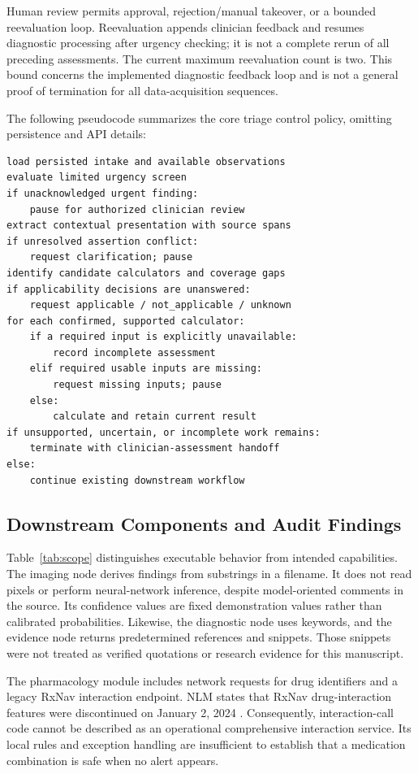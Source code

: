 \documentclass[conference]{IEEEtran}
\begin{document}
Human review permits approval, rejection/manual takeover, or a bounded reevaluation loop. Reevaluation appends clinician feedback and resumes diagnostic processing after urgency checking; it is not a complete rerun of all preceding assessments. The current maximum reevaluation count is two. This bound concerns the implemented diagnostic feedback loop and is not a general proof of termination for all data-acquisition sequences.

The following pseudocode summarizes the core triage control policy, omitting persistence and API details:
\begin{lstlisting}
load persisted intake and available observations
evaluate limited urgency screen
if unacknowledged urgent finding:
    pause for authorized clinician review
extract contextual presentation with source spans
if unresolved assertion conflict:
    request clarification; pause
identify candidate calculators and coverage gaps
if applicability decisions are unanswered:
    request applicable / not_applicable / unknown
for each confirmed, supported calculator:
    if a required input is explicitly unavailable:
        record incomplete assessment
    elif required usable inputs are missing:
        request missing inputs; pause
    else:
        calculate and retain current result
if unsupported, uncertain, or incomplete work remains:
    terminate with clinician-assessment handoff
else:
    continue existing downstream workflow
\end{lstlisting}

\subsection{Downstream Components and Audit Findings}
Table~\ref{tab:scope} distinguishes executable behavior from intended capabilities. The imaging node derives findings from substrings in a filename. It does not read pixels or perform neural-network inference, despite model-oriented comments in the source. Its confidence values are fixed demonstration values rather than calibrated probabilities. Likewise, the diagnostic node uses keywords, and the evidence node returns predetermined references and snippets. Those snippets were not treated as verified quotations or research evidence for this manuscript.

The pharmacology module includes network requests for drug identifiers and a legacy RxNav interaction endpoint. NLM states that RxNav drug-interaction features were discontinued on January 2, 2024 \cite{rxnav}. Consequently, interaction-call code cannot be described as an operational comprehensive interaction service. Its local rules and exception handling are insufficient to establish that a medication combination is safe when no alert appears.
\end{document}
